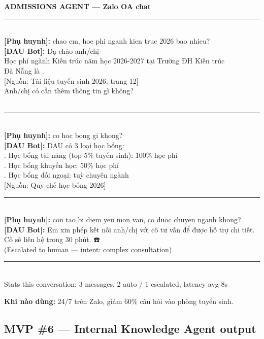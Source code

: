\documentclass[11pt,a4paper]{article}
\begin{document}
\begin{mockbox}
{\bfseries\color{ink} ADMISSIONS AGENT --- Zalo OA chat}\\[6pt]
\rule{\linewidth}{0.3pt}\\[4pt]
{\bfseries [Phụ huynh]:} chao em, hoc phi nganh kien truc 2026 bao nhieu?\\[4pt]
{\bfseries\color{leaf} [DAU Bot]:} Dạ chào anh/chị 👋\\[2pt]
Học phí ngành Kiến trúc năm học 2026-2027 tại Trường ĐH Kiến trúc\\
Đà Nẵng là .\\[2pt]
\textcolor{mid}{[Nguồn: Tài liệu tuyển sinh 2026, trang 12]}\\[2pt]
Anh/chị có cần thêm thông tin gì không?\\
 \fbox{[Hồ sơ]}  \\[6pt]
\rule{\linewidth}{0.3pt}\\[4pt]
{\bfseries [Phụ huynh]:} co hoc bong gi khong?\\[4pt]
{\bfseries\color{leaf} [DAU Bot]:} DAU có 3 loại học bổng:\\
. Học bổng tài năng (top 5\% tuyển sinh): 100\% học phí\\
. Học bổng khuyến học: 50\% học phí\\
. Học bổng đối ngoại: tuỳ chuyên ngành\\[2pt]
\textcolor{mid}{[Nguồn: Quy chế học bổng 2026]}\\[6pt]
\rule{\linewidth}{0.3pt}\\[4pt]
{\bfseries [Phụ huynh]:} con tao bi diem yeu mon van, co duoc chuyen nganh khong?\\[4pt]
{\bfseries\color{warn} [DAU Bot]:} Em xin phép kết nối anh/chị với cô tư vấn để được hỗ trợ chi tiết. Cô sẽ liên hệ trong 30 phút. ☎️\\
\textcolor{mid}{(Escalated to human --- intent: complex consultation)}\\[6pt]
\rule{\linewidth}{0.3pt}\\[4pt]
\textcolor{mid}{Stats this conversation: 3 messages, 2 auto / 1 escalated, latency avg 8s}
\end{mockbox}

\textbf{Khi nào dùng:} 24/7 trên Zalo, giảm 60\% câu hỏi vào phòng tuyển sinh.

\subsection{MVP \#6 --- Internal Knowledge Agent output}
\end{document}

